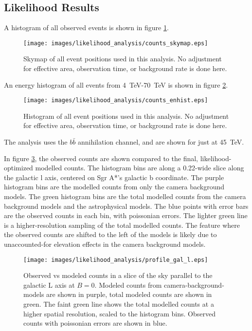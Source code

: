   \subsection{Likelihood Results}
  
  A histogram of all observed events is shown in figure \ref{fig:gc_counts_skymap}.
  
  \begin{figure}[ht]
    \centering
    \texttt{[image: images/likelihood\_analysis/counts\_skymap.eps]}
    \caption[Galactic Center Counts Skymap]{
      Skymap of all event positions used in this analysis.
      No adjustment for effective area, observation time, or background rate is done here.
    }
    \label{fig:gc_counts_skymap}
  \end{figure}

  An energy histogram of all events from \SI{4}{TeV}-\SI{70}{TeV} is shown in figure \ref{fig:gc_counts_enhist}.
  
  \begin{figure}[ht]
    \centering
    \texttt{[image: images/likelihood\_analysis/counts\_enhist.eps]}
    \caption[Galactic Center Counts Energy Histogram]{
      Histogram of all event positions used in this analysis.
      No adjustment for effective area, observation time, or background rate is done here.
    }
    \label{fig:gc_counts_enhist}
  \end{figure}

  The analysis uses the $b\bar{b}$ annihilation channel, and are shown for just at \SI{45}{TeV}.

  In figure \ref{fig:gc_profile_gal_l}, the observed counts are shown compared to the final, likelihood-optimized modelled counts.
  The histogram bins are along a 0.22\degree-wide slice along the galactic l axis, centered on Sgr A*'s galactic b coordinate.
  The purple histogram bins are the modelled counts from only the camera background models.
  The green histogram bins are the total modelled counts from the camera background models and the astrophysical models.
  The blue points with error bars are the observed counts in each bin, with poissonian errors.
  The lighter green line is a higher-resolution sampling of the total modelled counts.
  The feature where the observed counts are shifted to the left of the models is likely due to unaccounted-for elevation effects in the camera background models.
  
  \begin{figure}[h]
    \centering
    \texttt{[image: images/likelihood\_analysis/profile\_gal\_l.eps]}
    \caption[Galactic Center Profile vs Galactic L]{
      Observed vs modeled counts in a slice of the sky parallel to the galactic L axis at $B=0$.
      Modeled counts from camera-background-models are shown in purple, total modeled counts are shown in green.
      The faint green line shows the total modelled counts at a higher spatial resolution, scaled to the histogram bins.
      Observed counts with poissonian errors are shown in blue.
    }
    \label{fig:gc_profile_gal_l}
  \end{figure}

